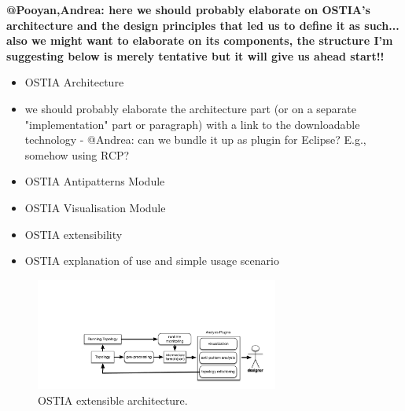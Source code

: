 \textbf{@Pooyan,Andrea: here we should probably elaborate on OSTIA's architecture and the design principles that led us to define it as such... also we might want to elaborate on its components, the structure I'm suggesting below is merely tentative but it will give us ahead start!!}

\begin{itemize}
\item OSTIA Architecture 
\item we should probably elaborate the architecture part (or on a separate "implementation" part or paragraph) with a link to the downloadable technology - @Andrea: can we bundle it up as plugin for Eclipse? E.g., somehow using RCP?
\item OSTIA Antipatterns Module
\item OSTIA Visualisation Module 
\item OSTIA extensibility
\item OSTIA explanation of use and simple usage scenario
\end{itemize}


\begin{figure}[H]
	\begin{center}
		\includegraphics[width=8cm]{images/ostia-arch}
		\caption{OSTIA extensible architecture.}
		\label{fig:ostia-arch}
	\end{center}
\end{figure}